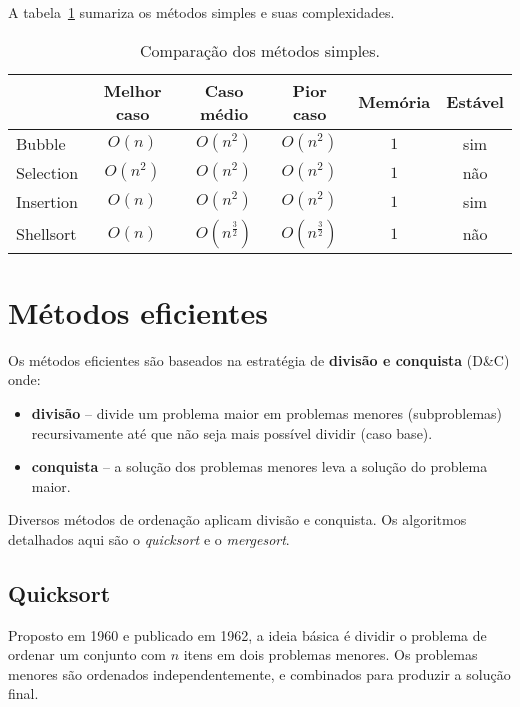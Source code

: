 A tabela~\ref{aula03:tab:caso01} sumariza os métodos simples e suas complexidades.
%
\begin{table}[!ht]
\centering
\caption{Comparação dos métodos simples.}
\begin{tabular}{lccccc}
\hline
          & Melhor caso & Caso médio & Pior caso & Memória & Estável \\ \hline
Bubble    & $O(n)$ & $O(n^2)$ & $O(n^2)$ & $1$ & sim \\ \hline
Selection & $O(n^2)$ & $O(n^2)$ & $O(n^2)$ & $1$ & não  \\ \hline
Insertion & $O(n)$ & $O(n^2)$ & $O(n^2)$ & $1$ &  sim \\ \hline
Shellsort & $O(n)$ & $O(n^{\frac{3}{2}})$ & $O(n^{\frac{3}{2}})$ &  $1$ & não \\ \hline
\end{tabular}
\label{aula03:tab:caso01}
\end{table}

\section{Métodos eficientes}

Os métodos eficientes são baseados na estratégia de {\bf divisão e conquista} (D\&C)
onde:
\begin{itemize}
\item {\bf divisão} -- divide um problema maior em problemas menores (subproblemas) 
recursivamente até que não seja mais possível dividir (caso base).

\item {\bf conquista} -- a solução dos problemas menores leva a solução do problema maior.
\end{itemize}

Diversos métodos de ordenação aplicam divisão e conquista. Os algoritmos detalhados
aqui são o \emph{quicksort} e o \emph{mergesort}.

\subsection{Quicksort}

Proposto em 1960 e publicado em 1962, a ideia básica é dividir o problema de
ordenar um conjunto com $n$ itens em dois problemas menores.
Os problemas menores são ordenados independentemente, e combinados para
produzir a solução final.

